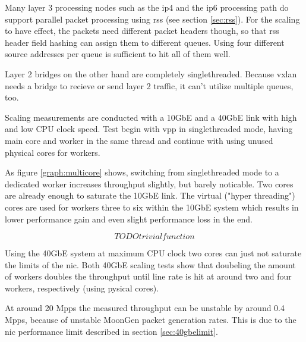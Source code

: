 Many layer 3 processing nodes such as the \Ac{ip4} and the \Ac{ip6}
processing path do support parallel packet processing using \Ac{rss}
(see section \ref{sec:rss}). For the scaling to have effect, the
packets need different packet headers though, so that \Ac{rss} header
field hashing can assign them to different queues. Using four
different source addresses per queue is sufficient to hit all of them
well.

Layer 2 bridges on the other hand are completely singlethreaded.
Because \Ac{vxlan} needs a bridge to recieve or send layer 2 traffic,
it can't utilize multiple queues, too.

Scaling measurements are conducted with a 10GbE and a 40GbE link with
high and low CPU clock speed. Test begin with \Ac{vpp} in
singlethreaded mode, having main core and worker in the same thread
and continue with using unused physical cores for workers.

As figure \ref{graph:multicore} shows, switching from singlethreaded
mode to a dedicated worker increases throughput slightly, but barely
noticable. Two cores are already enough to saturate the 10GbE link.
The virtual ("hyper threading") cores are used for workers three to
six within the 10GbE system which results in lower performance gain
and even slight performance loss in the end.

$$ TODO trivial function $$

Using the 40GbE system at maximum CPU clock two cores can just not
saturate the limits of the \Ac{nic}. Both 40GbE scaling tests show
that doubeling the amount of workers doubles the throughput until line
rate is hit at around two and four workers, respectively (using
pysical cores).

At around 20 Mpps the measured throughput can be unstable by around 0.4
Mpps, because of unstable MoonGen packet generation rates. This is
due to the \Ac{nic} performance limit described in section
\ref{sec:40gbelimit}.






